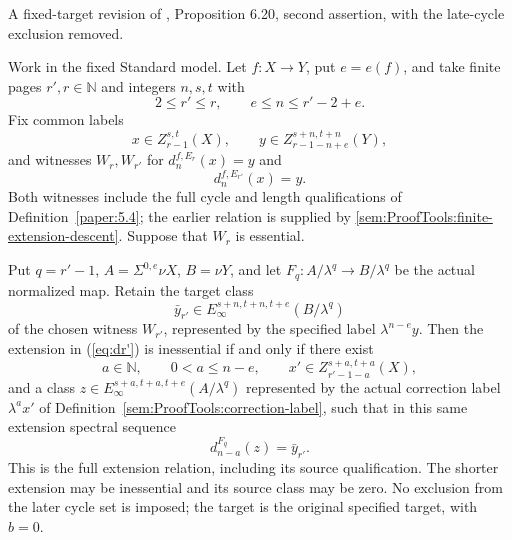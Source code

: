 \begin{proposition}
\label{paper:6.20}
A fixed-target revision of \cite{LWX126}, Proposition 6.20, second assertion, with the late-cycle exclusion removed.\par
\label{prop:dec738d3}
Work in the fixed Standard model. Let $f:X\to Y$, put $e=e(f)$, and take finite pages $r',r\in\mathbb N$ and integers $n,s,t$ with
\[
2\le r'\le r,\qquad e\le n\le r'-2+e.
\]
Fix common labels
\[
x\in Z_{r-1}^{s,t}(X),\qquad y\in Z_{r-1-n+e}^{s+n,t+n}(Y),
\]
and witnesses $W_r,W_{r'}$ for $d_n^{f,E_r}(x)=y$ and
\begin{equation}\label{eq:dr'}
d_n^{f,E_{r'}}(x)=y.
\end{equation}
Both witnesses include the full cycle and length qualifications of Definition~\ref{paper:5.4}; the earlier relation is supplied by \ref{sem:ProofTools:finite-extension-descent}. Suppose that $W_r$ is essential.

Put $q=r'-1$, $A=\Sigma^{0,e}\nu X$, $B=\nu Y$, and let $F_q:A/\lambda^q\to B/\lambda^q$ be the actual normalized map. Retain the target class
\[
\bar y_{r'}\in E_\infty^{s+n,t+n,t+e}(B/\lambda^q)
\]
of the chosen witness $W_{r'}$, represented by the specified label $\lambda^{n-e}y$. Then the extension in (\ref{eq:dr'}) is inessential if and only if there exist
\[
a\in\mathbb N,\qquad 0<a\le n-e,\qquad
x'\in Z_{r'-1-a}^{s+a,t+a}(X),
\]
and a class $z\in E_\infty^{s+a,t+a,t+e}(A/\lambda^q)$ represented by the actual correction label $\lambda^a x'$ of Definition~\ref{sem:ProofTools:correction-label}, such that in this same extension spectral sequence
\[
d_{n-a}^{F_q}(z)=\bar y_{r'}.
\]
This is the full extension relation, including its source qualification. The shorter extension may be inessential and its source class may be zero. No exclusion from the later cycle set is imposed; the target is the original specified target, with $b=0$.
\end{proposition}

